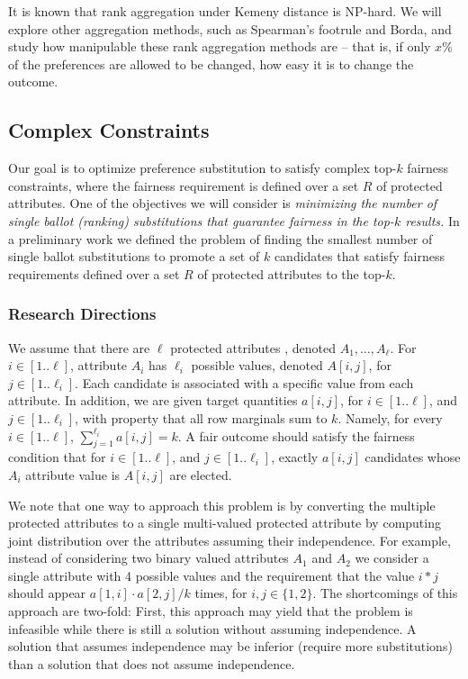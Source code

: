 \documentclass[11pt]{article}
\begin{document}
\smallskip {} It is known that rank aggregation under Kemeny distance is NP-hard. We will explore other aggregation methods, such as Spearman's footrule and Borda, and study how manipulable these rank aggregation methods are -- that is, if only $x\%$ of the preferences are allowed to be changed, how easy it is to change the outcome.
\vspace{-0.1in}
\subsection{Complex Constraints} 
\vspace{-0.1in}
Our goal is to optimize preference substitution to satisfy complex top-$k$ fairness constraints, where the fairness requirement is defined over a set $R$ of protected attributes. One of the objectives we will consider is {\em minimizing the number of single ballot (ranking) substitutions that guarantee fairness in the top-$k$ results.} 
In a preliminary work we defined the problem of finding the smallest number of single ballot substitutions to promote a set of $k$ candidates that satisfy fairness requirements defined over a set $R$ of protected attributes to the top-$k$. 
\vspace{-0.1in}
\subsubsection{Research Directions}
\vspace{-0.1in}
We assume that there are $\ell$ protected attributes , denoted $A_1,\dots, A_\ell$. For $i\in [1..\ell]$, attribute $A_i$ has $\ell_i$ possible values, denoted $A[i,j]$, for $j\in [1..\ell_i]$. Each candidate is associated with a specific value from each attribute.
In addition, we are given target quantities $a[i,j]$, for $i\in [1..\ell]$, and  $j\in [1..\ell_i]$, with property that all row marginals sum to $k$. Namely, for every $i\in [1..\ell]$, $\sum_{j=1}^{\ell_i} a[i,j] = k$. A fair outcome should satisfy the fairness  condition that for $i\in [1..\ell]$, and  $j\in [1..\ell_i]$, exactly $a[i,j]$ candidates whose $A_i$ attribute value is $A[i,j]$ are elected. 

\noindent We note that one way to approach this problem is by converting the multiple protected attributes to a single multi-valued protected attribute by computing joint distribution over the attributes assuming their independence. For example, instead of considering two binary valued attributes $A_1$ and $A_2$ we consider a single attribute with 4 possible values and the requirement that the value $i*j$ should appear $a[1,i]\cdot a[2,j]/k$ times, for $i,j\in \{1,2\}$. The shortcomings of this approach are two-fold: First, this approach may yield that the problem is infeasible while there is still a solution without assuming independence. A solution that assumes independence may be inferior (require more substitutions) than a solution that does not assume independence.
\end{document}
